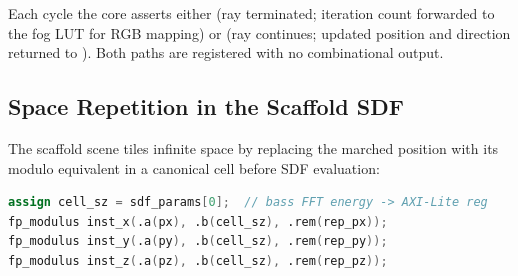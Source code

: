 Each cycle the core asserts either  (ray terminated; iteration count forwarded to the fog LUT for RGB mapping) or  (ray continues; updated position and direction returned to ). Both paths are registered with no combinational output.

\subsection{Space Repetition in the Scaffold SDF}

The scaffold scene tiles infinite space by replacing the marched position with
its modulo equivalent in a canonical cell before SDF evaluation:

\begin{lstlisting}[language=Verilog]
assign cell_sz = sdf_params[0];  // bass FFT energy -> AXI-Lite reg
fp_modulus inst_x(.a(px), .b(cell_sz), .rem(rep_px));
fp_modulus inst_y(.a(py), .b(cell_sz), .rem(rep_py));
fp_modulus inst_z(.a(pz), .b(cell_sz), .rem(rep_pz));
\end{lstlisting}

